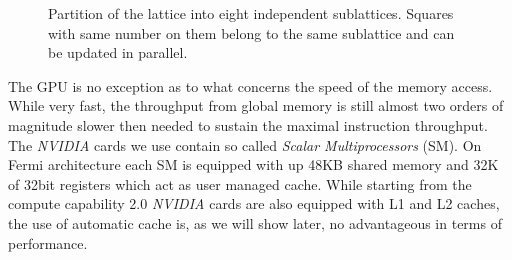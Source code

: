 \documentclass[a4paper]{llncs}
\def\bksize{8}
\begin{document}
\begin{figure}
\begin{center}
\end{center}
\caption{\label{fig:part}Partition of the lattice into eight
  independent sublattices. Squares with same number on them belong to
  the same sublattice and can be updated in parallel.}
\end{figure}

The GPU is no exception as to what concerns the speed of the memory access.
While very fast, the throughput from global memory is still almost two orders
of magnitude slower then needed to sustain the maximal instruction throughput.
The \emph{NVIDIA} cards we use contain so called \emph{Scalar Multiprocessors}
(SM). On Fermi architecture each SM is equipped with up 48KB shared memory and
32K of 32bit registers\cite{Fermi} which act as user managed cache. While
starting from the compute capability 2.0 \emph{NVIDIA} cards are also equipped
with L1 and L2 caches, the use of automatic cache is, as we will show later, no
advantageous in terms of performance.
\end{document}
